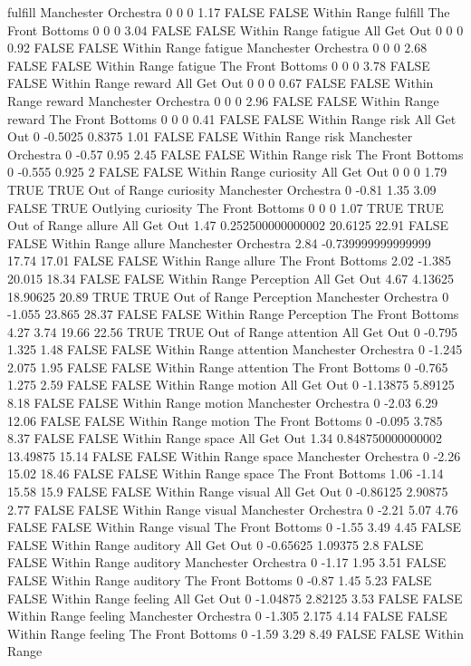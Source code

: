 fulfill Manchester Orchestra 0 0 0 1.17 FALSE FALSE Within Range
fulfill The Front Bottoms 0 0 0 3.04 FALSE FALSE Within Range
fatigue All Get Out 0 0 0 0.92 FALSE FALSE Within Range
fatigue Manchester Orchestra 0 0 0 2.68 FALSE FALSE Within Range
fatigue The Front Bottoms 0 0 0 3.78 FALSE FALSE Within Range
reward All Get Out 0 0 0 0.67 FALSE FALSE Within Range
reward Manchester Orchestra 0 0 0 2.96 FALSE FALSE Within Range
reward The Front Bottoms 0 0 0 0.41 FALSE FALSE Within Range
risk All Get Out 0 -0.5025 0.8375 1.01 FALSE FALSE Within Range
risk Manchester Orchestra 0 -0.57 0.95 2.45 FALSE FALSE Within Range
risk The Front Bottoms 0 -0.555 0.925 2 FALSE FALSE Within Range
curiosity All Get Out 0 0 0 1.79 TRUE TRUE Out of Range
curiosity Manchester Orchestra 0 -0.81 1.35 3.09 FALSE TRUE Outlying
curiosity The Front Bottoms 0 0 0 1.07 TRUE TRUE Out of Range
allure All Get Out 1.47 0.252500000000002 20.6125 22.91 FALSE FALSE Within Range
allure Manchester Orchestra 2.84 -0.739999999999999 17.74 17.01 FALSE FALSE Within Range
allure The Front Bottoms 2.02 -1.385 20.015 18.34 FALSE FALSE Within Range
Perception All Get Out 4.67 4.13625 18.90625 20.89 TRUE TRUE Out of Range
Perception Manchester Orchestra 0 -1.055 23.865 28.37 FALSE FALSE Within Range
Perception The Front Bottoms 4.27 3.74 19.66 22.56 TRUE TRUE Out of Range
attention All Get Out 0 -0.795 1.325 1.48 FALSE FALSE Within Range
attention Manchester Orchestra 0 -1.245 2.075 1.95 FALSE FALSE Within Range
attention The Front Bottoms 0 -0.765 1.275 2.59 FALSE FALSE Within Range
motion All Get Out 0 -1.13875 5.89125 8.18 FALSE FALSE Within Range
motion Manchester Orchestra 0 -2.03 6.29 12.06 FALSE FALSE Within Range
motion The Front Bottoms 0 -0.095 3.785 8.37 FALSE FALSE Within Range
space All Get Out 1.34 0.848750000000002 13.49875 15.14 FALSE FALSE Within Range
space Manchester Orchestra 0 -2.26 15.02 18.46 FALSE FALSE Within Range
space The Front Bottoms 1.06 -1.14 15.58 15.9 FALSE FALSE Within Range
visual All Get Out 0 -0.86125 2.90875 2.77 FALSE FALSE Within Range
visual Manchester Orchestra 0 -2.21 5.07 4.76 FALSE FALSE Within Range
visual The Front Bottoms 0 -1.55 3.49 4.45 FALSE FALSE Within Range
auditory All Get Out 0 -0.65625 1.09375 2.8 FALSE FALSE Within Range
auditory Manchester Orchestra 0 -1.17 1.95 3.51 FALSE FALSE Within Range
auditory The Front Bottoms 0 -0.87 1.45 5.23 FALSE FALSE Within Range
feeling All Get Out 0 -1.04875 2.82125 3.53 FALSE FALSE Within Range
feeling Manchester Orchestra 0 -1.305 2.175 4.14 FALSE FALSE Within Range
feeling The Front Bottoms 0 -1.59 3.29 8.49 FALSE FALSE Within Range
